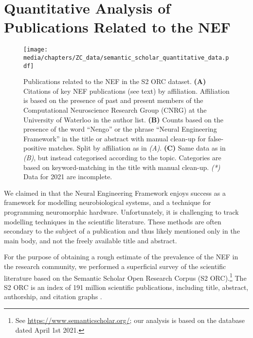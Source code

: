 
\section{Quantitative Analysis of Publications Related to the NEF}
\label{app:nef_literature}

\begin{figure}[p]
	\centering
	\texttt{[image: media/chapters/ZC\_data/semantic\_scholar\_quantitative\_data.pdf]}%
	{\label{fig:nef_literature_a}}%
	{\label{fig:nef_literature_b}}%
	{\label{fig:nef_literature_c}}%
	\caption[Publications related to the NEF in the S2 ORC dataset]{Publications related to the NEF in the S2 ORC dataset.
	\textbf{(A)} Citations of key NEF publications (see text) by affiliation. Affiliation is based on the presence of past and present members of the Computational Neuroscience Research Group (CNRG) at the University of Waterloo in the author list.
	\textbf{(B)} Counts based on the presence of the word \enquote{Nengo} or the phrase \enquote{Neural Engineering Framework} in the title or abstract with manual clean-up for false-positive matches. Split by affiliation as in \emph{(A)}.
	\textbf{(C)} Same data as in \emph{(B)}, but instead categorised according to the topic. Categories are based on keyword-matching in the title with manual clean-up.
	\emph{(*)} Data for 2021 are incomplete.}
	\label{fig:nef_literature}
\end{figure}

We claimed in  that the Neural Engineering Framework enjoys success as a framework for modelling neurobiological systems, and a technique for programming neuromorphic hardware.
Unfortunately, it is challenging to track modelling techniques in the scientific literature.
These methods are often secondary to the subject of a publication and thus likely mentioned only in the main body, and not the freely available title and abstract.

For the purpose of obtaining a rough estimate of the prevalence of the NEF in the research community, we performed a superficial survey of the scientific literature based on the Semantic Scholar Open Research Corpus (S2 ORC).\footnote{See \url{https://www.semanticscholar.org/}; our analysis is based on the database dated April 1st 2021.}
The S2 ORC is an index of 191 million scientific publications, including title, abstract, authorship, and citation graphs \citep{ammar2018construction}.


